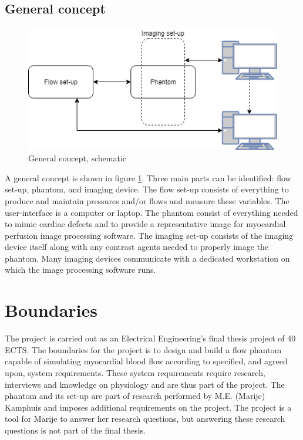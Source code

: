 \subsection{General concept}
\begin{figure}[b!]
	\begin{center}
		\includegraphics[width=0.75\linewidth]{images/global_setup.png}
	\end{center}
	\caption{General concept, schematic}
	\label{fig:general_concept}
\end{figure}
A general concept is shown in figure \ref{fig:general_concept}. Three main parts can be identified: flow set-up, phantom, and imaging device. The flow set-up consists of everything to produce and maintain pressures and/or flows and measure these variables. The user-interface is a computer or laptop. The phantom consist of everything needed to mimic cardiac defects and to provide a representative image for myocardial perfusion image processing software. The imaging set-up consists of the imaging device itself along with any contrast agents needed to properly image the phantom. Many imaging devices communicate with a dedicated workstation on which the image processing software runs.

\section{Boundaries}
The project is carried out as an Electrical Engineering's final thesis project of 40 \ac{ECTS}. The boundaries for the project is to design and build a flow phantom capable of simulating myocardial blood flow according to specified, and agreed upon, system requirements. These system requirements require research, interviews and knowledge on physiology and are thus part of the project. The phantom and its set-up are part of research performed by M.E. (Marije) Kamphuis and imposes additional requirements on the project. The project is a tool for Marije to answer her research questions, but answering these research questions is not part of the final thesis. 

